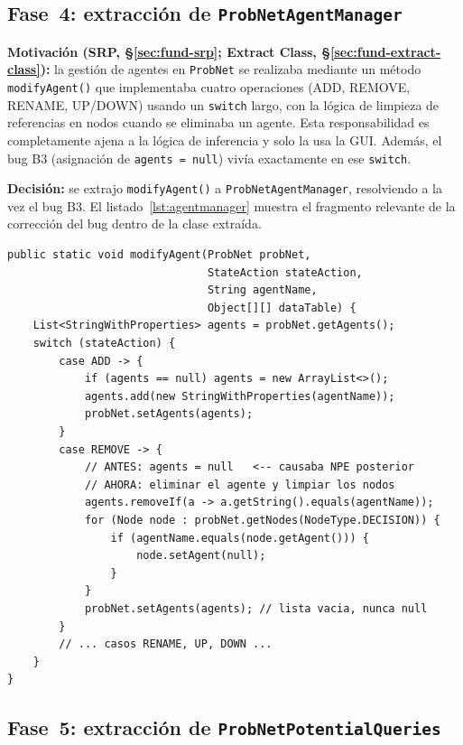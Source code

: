 \documentclass[11pt,a4paper]{article}
\newcommand{\code}[1]{\texttt{#1}}
\begin{document}
\subsection{Fase~4: extracción de \texttt{ProbNetAgentManager}}
\label{sec:agentmanager}

\textbf{Motivación (SRP, §\ref{sec:fund-srp}; Extract Class,
§\ref{sec:fund-extract-class}):}
la gestión de agentes en \code{ProbNet} se realizaba mediante un método
\code{modifyAgent()} que implementaba cuatro operaciones (ADD, REMOVE,
RENAME, UP/DOWN) usando un \code{switch} largo, con la lógica de
limpieza de referencias en nodos cuando se eliminaba un agente.  Esta
responsabilidad es completamente ajena a la lógica de inferencia y
solo la usa la GUI.  Además, el bug B3 (asignación de \code{agents =
null}) vivía exactamente en ese \code{switch}.

\textbf{Decisión:} se extrajo \code{modifyAgent()} a
\code{ProbNetAgentManager}, resolviendo a la vez el bug B3.  El
listado~\ref{lst:agentmanager} muestra el fragmento relevante de la
corrección del bug dentro de la clase extraída.

\begin{lstlisting}[caption={Bug B3 corregido en \texttt{ProbNetAgentManager.modifyAgent()}.},
                   label=lst:agentmanager]
public static void modifyAgent(ProbNet probNet,
                               StateAction stateAction,
                               String agentName,
                               Object[][] dataTable) {
    List<StringWithProperties> agents = probNet.getAgents();
    switch (stateAction) {
        case ADD -> {
            if (agents == null) agents = new ArrayList<>();
            agents.add(new StringWithProperties(agentName));
            probNet.setAgents(agents);
        }
        case REMOVE -> {
            // ANTES: agents = null   <-- causaba NPE posterior
            // AHORA: eliminar el agente y limpiar los nodos
            agents.removeIf(a -> a.getString().equals(agentName));
            for (Node node : probNet.getNodes(NodeType.DECISION)) {
                if (agentName.equals(node.getAgent())) {
                    node.setAgent(null);
                }
            }
            probNet.setAgents(agents); // lista vacia, nunca null
        }
        // ... casos RENAME, UP, DOWN ...
    }
}
\end{lstlisting}

\subsection{Fase~5: extracción de \texttt{ProbNetPotentialQueries}}
\label{sec:potentialqueries}
\end{document}
